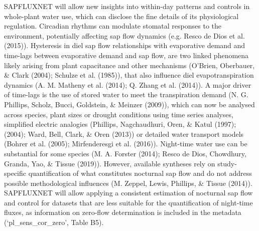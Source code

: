 \documentclass[11pt,twoside]{reedthesis}
\begin{document}
SAPFLUXNET will allow new insights into within-day patterns and controls
in whole-plant water use, which can disclose the fine details of its
physiological regulation. Circadian rhythms can modulate stomatal
responses to the environment, potentially affecting sap flow dynamics
(e.g. Resco de Dios et al. (2015)). Hysteresis in diel sap flow
relationships with evaporative demand and time-lags between evaporative
demand and sap flow, are two linked phenomena likely arising from plant
capacitance and other mechanisms (O'Brien, Oberbauer, \& Clark (2004);
Schulze et al. (1985)), that also influence diel evapotranspiration
dynamics (A. M. Matheny et al. (2014); Q. Zhang et al. (2014)). A major
driver of time-lags is the use of stored water to meet the transpiration
demand (N. G. Phillips, Scholz, Bucci, Goldstein, \& Meinzer (2009)),
which can now be analysed across species, plant sizes or drought
conditions using time series analyses, simplified electric analogies
(Phillips, Nagchaudhuri, Oren, \& Katul (1997); (2004); Ward, Bell,
Clark, \& Oren (2013)) or detailed water transport models (Bohrer et al.
(2005); Mirfenderesgi et al. (2016)). Night-time water use can be
substantial for some species (M. A. Forster (2014); Resco de Dios,
Chowdhury, Granda, Yao, \& Tissue (2019)). However, available syntheses
rely on study-specific quantification of what constitutes nocturnal sap
flow and do not address possible methodological influences (M. Zeppel,
Lewis, Phillips, \& Tissue (2014)). SAPFLUXNET will allow applying a
consistent estimation of nocturnal sap flow and control for datasets
that are less suitable for the quantification of night-time fluxes, as
information on zero-flow determination is included in the metadata
(`pl\_sens\_cor\_zero', Table B5).\par
\end{document}
